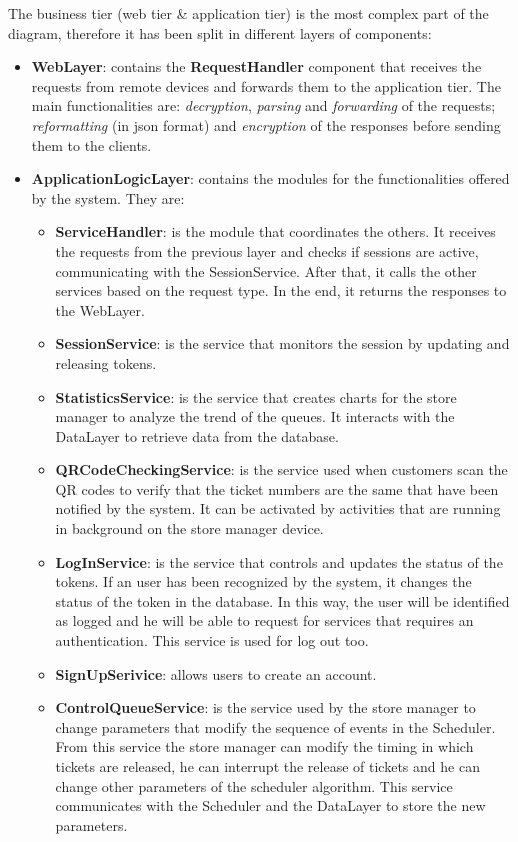 The business tier (web tier \& application tier) is the most complex part of the diagram, therefore it has been split in different layers of components:
\begin{itemize}
	\item \textbf{WebLayer}: contains the \textbf{RequestHandler} component that receives the requests from remote devices and forwards them to the application tier. The main functionalities are: \textit{decryption}, \textit{parsing} and \textit{forwarding} of the requests; \textit{reformatting} (in \gls{json} format) and \textit{encryption} of the responses before sending them to the clients.
	
	\item \textbf{ApplicationLogicLayer}: contains the modules for the functionalities offered by the system. They are:
		\begin{itemize}
			\item \textbf{ServiceHandler}: is the module that coordinates the others. It receives the requests from the previous layer and checks if sessions are active, communicating with the SessionService. After that, it calls the other services based on the request type. In the end, it returns the responses to the WebLayer.
			\item \textbf{SessionService}: is the service that monitors the session by updating and releasing tokens.
			\item \textbf{StatisticsService}: is the service that creates charts for the store manager to analyze the trend of the queues. It interacts with the DataLayer to retrieve data from the database.
			\item \textbf{QRCodeCheckingService}: is the service used when customers scan the QR codes to verify that the ticket numbers are the same that have been notified by the system. It can be activated by activities that are running in background on the store manager device.
			\item \textbf{LogInService}: is the service that controls and updates the status of the tokens. If an user has been recognized by the system, it changes the status of the token in the database. In this way, the user will be identified as logged and he will be able to request for services that requires an authentication.
			This service is used for log out too.
			\item \textbf{SignUpSerivice}: allows users to create an account.
			\item \textbf{ControlQueueService}: is the service used by the store manager to change parameters that modify the sequence of events in the Scheduler. From this service the store manager can modify the timing in which tickets are released, he can interrupt the release of tickets and he can change other parameters of the scheduler algorithm. This service communicates with the Scheduler and the DataLayer to store the new parameters.

\end{itemize}
\end{itemize}
